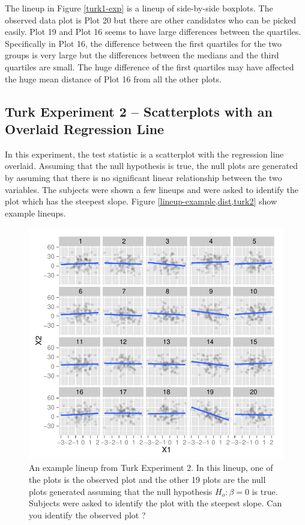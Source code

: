 \documentclass[12]{article}
\begin{document}
The lineup in Figure \ref{turk1-exp} is a lineup of side-by-side boxplots. The observed data plot is Plot 20 but there are other candidates who can be picked easily. Plot 19 and Plot 16 seems to have large differences between the quartiles. Specifically in Plot 16, the difference between the  
first quartiles for the two groups is very large but the differences between the medians and the third quartiles are small. The huge difference of the first quartiles may have affected the huge mean distance of Plot 16 from all the other plots.   

\subsection{Turk Experiment 2 -- Scatterplots with an Overlaid Regression Line}

In this experiment, the test statistic is a scatterplot with the regression line overlaid. Assuming that the null hypothesis is true, the null plots are generated by assuming that there is no significant linear relationship between the two variables. The subjects were shown a few lineups and were asked to identify the plot which has the steepest slope. Figure \ref{lineup-example,dist,turk2} show example lineups. 

\begin{figure}[htbp]
\centering
\includegraphics[width=.95\textwidth]{turk2-example.pdf}
\caption{An example lineup from Turk Experiment 2. In this lineup, one of the plots is the observed plot and the other 19 plots are the null plots generated assuming that the null hypothesis $H_o : \beta = 0$ is true. Subjects were asked to identify the plot with the steepest slope. Can you identify the observed plot ?}
\label{turk2}
\end{figure}
\end{document}
